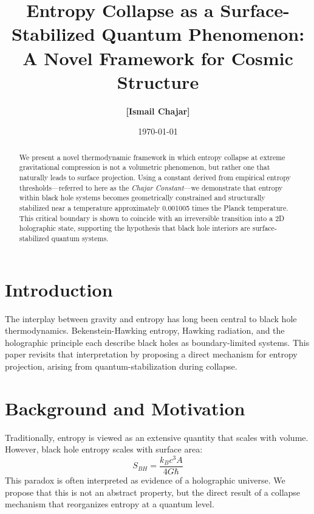 \documentclass[12pt]{article}
\title{Entropy Collapse as a Surface-Stabilized Quantum Phenomenon: \\ A Novel Framework for Cosmic Structure}
\author{\textbf{[Ismail Chajar]}}
\date{\today}
\begin{document}
\maketitle

\begin{abstract}
We present a novel thermodynamic framework in which entropy collapse at extreme gravitational compression is not a volumetric phenomenon, but rather one that naturally leads to surface projection. Using a constant derived from empirical entropy thresholds---referred to here as the \textit{Chajar Constant}---we demonstrate that entropy within black hole systems becomes geometrically constrained and structurally stabilized near a temperature approximately 0.001005 times the Planck temperature. This critical boundary is shown to coincide with an irreversible transition into a 2D holographic state, supporting the hypothesis that black hole interiors are surface-stabilized quantum systems.
\end{abstract}

\section{Introduction}
The interplay between gravity and entropy has long been central to black hole thermodynamics. Bekenstein-Hawking entropy, Hawking radiation, and the holographic principle each describe black holes as boundary-limited systems. This paper revisits that interpretation by proposing a direct mechanism for entropy projection, arising from quantum-stabilization during collapse.

\section{Background and Motivation}
Traditionally, entropy is viewed as an extensive quantity that scales with volume. However, black hole entropy scales with surface area:
\begin{equation}
S_{BH} = \frac{k_B c^3 A}{4 G \hbar}
\end{equation}
This paradox is often interpreted as evidence of a holographic universe. We propose that this is not an abstract property, but the direct result of a collapse mechanism that reorganizes entropy at a quantum level.
\end{document}
